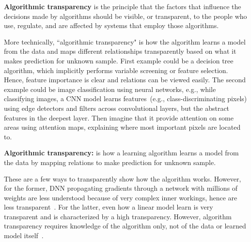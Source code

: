 \begin{definition}
    {\textbf{Algorithmic transparency}} is the principle that the factors that influence the decisions made by algorithms should be visible, or transparent, to the people who use, regulate, and are affected by systems that employ those algorithms.
\end{definition}

\hspace*{3.5mm} More technically, ``algorithmic transparency" is how the algorithm learns a model from the data and maps different relationships transparently based on what it makes prediction for unknown sample. First example could be a decision tree algorithm, which implicitly performs variable screening or feature selection. Hence, feature importance is clear and relations can be viewed easily. The second example could be image classification using neural networks, e.g., while classifying images, a CNN model learns features~(e.g., class-discriminating pixels) using edge detectors and filters across convolutional layers, but the abstract features in the deepest layer. Then imagine that it provide attention on some areas using attention maps, explaining where most important pixels are located to. \\

\vspace{-2mm}
\begin{tcolorbox}[colback=white!3!white,colframe=gray!120!black,title=\faBook~Algorithmic transparency]
    \scriptsize{
        \textbf{Algorithmic transparency:} is how a learning algorithm learns a model from the data by mapping relations to make prediction for unknown sample.
        }
\end{tcolorbox}

\hspace*{3.5mm} These are a few ways to transparently show how the algorithm works. However, for the former, DNN propagating gradients through a network with millions of weights are less understood because of very complex inner workings, hence are less transparent~\cite{molnar2019interpretable}. For the latter, even how a linear model learn is very transparent and is characterized by a high transparency. However, algorithm transparency requires knowledge of the algorithm only, not of the data or learned model itself~\cite{molnar2019interpretable}.

